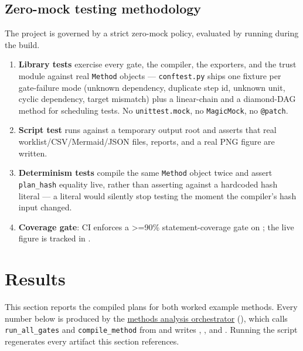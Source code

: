 \documentclass[
  english,
]{article}
\providecommand{\tightlist}{%
  \setlength{\itemsep}{0pt}\setlength{\parskip}{0pt}}
\begin{document}
\subsection{Zero-mock testing
methodology}\label{zero-mock-testing-methodology}

The project is governed by a strict zero-mock policy, evaluated by
running
during the build.

\begin{enumerate}
\def\labelenumi{\arabic{enumi}.}
\tightlist
\item
  \textbf{Library tests} exercise every gate, the compiler, the
  exporters, and the trust module against real \texttt{Method} objects
  --- \texttt{conftest.py} ships one fixture per gate-failure mode
  (unknown dependency, duplicate step id, unknown unit, cyclic
  dependency, target mismatch) plus a linear-chain and a diamond-DAG
  method for scheduling tests. No \texttt{unittest.mock}, no
  \texttt{MagicMock}, no \texttt{@patch}.
\item
  \textbf{Script test} runs  against a
  temporary output root and asserts that real worklist/CSV/Mermaid/JSON
  files, reports, and a real PNG figure are written.
\item
  \textbf{Determinism tests} compile the same \texttt{Method} object
  twice and assert \texttt{plan\_hash} equality live, rather than
  asserting against a hardcoded hash literal --- a literal would
  silently stop testing the moment the compiler's hash input changed.
\item
  \textbf{Coverage gate}: CI enforces a \texorpdfstring{\textgreater{}=}{>=}90\% statement-coverage gate on
  ; the live
  figure is tracked in
  \href{../../../../docs/_generated/COUNTS.md}{}.
\end{enumerate}

\newpage

\section{Results}\label{sec:results}

This section reports the compiled plans for both worked example methods.
Every number below is produced by the
\href{https://github.com/docxology/template/blob/main/projects/templates/template_methods_paper/scripts/methods_analysis.py}{methods
analysis orchestrator} (), which
calls \texttt{run\_all\_gates} and \texttt{compile\_method} from
 and writes
,
, and
. Running the script
regenerates every artifact this section references.
\end{document}

